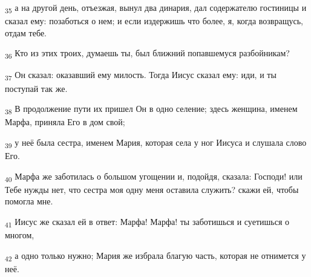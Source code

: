\begin{tcolorbox}
\textsubscript{35} а на другой день, отъезжая, вынул два динария, дал содержателю гостиницы и сказал ему: позаботься о нем; и если издержишь что более, я, когда возвращусь, отдам тебе.
\end{tcolorbox}
\begin{tcolorbox}
\textsubscript{36} Кто из этих троих, думаешь ты, был ближний попавшемуся разбойникам?
\end{tcolorbox}
\begin{tcolorbox}
\textsubscript{37} Он сказал: оказавший ему милость. Тогда Иисус сказал ему: иди, и ты поступай так же.
\end{tcolorbox}
\begin{tcolorbox}
\textsubscript{38} В продолжение пути их пришел Он в одно селение; здесь женщина, именем Марфа, приняла Его в дом свой;
\end{tcolorbox}
\begin{tcolorbox}
\textsubscript{39} у неё была сестра, именем Мария, которая села у ног Иисуса и слушала слово Его.
\end{tcolorbox}
\begin{tcolorbox}
\textsubscript{40} Марфа же заботилась о большом угощении и, подойдя, сказала: Господи! или Тебе нужды нет, что сестра моя одну меня оставила служить? скажи ей, чтобы помогла мне.
\end{tcolorbox}
\begin{tcolorbox}
\textsubscript{41} Иисус же сказал ей в ответ: Марфа! Марфа! ты заботишься и суетишься о многом,
\end{tcolorbox}
\begin{tcolorbox}
\textsubscript{42} а одно только нужно; Мария же избрала благую часть, которая не отнимется у неё.
\end{tcolorbox}
